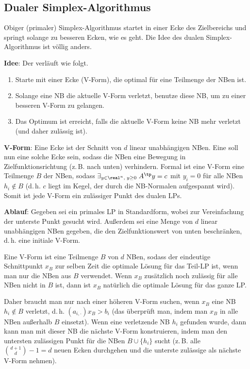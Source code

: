 \pagebreak

\subsection{%
    Dualer Simplex-Algorithmus%
}

Obiger (primaler) Simplex-Algorithmus startet in einer Ecke des Zielbereichs und springt solange
zu besseren Ecken, wie es geht.
Die Idee des dualen Simplex-Algorithmus ist völlig anders.

\textbf{Idee}:
Der  verläuft wie folgt.
\begin{enumerate}
    \item
    Starte mit einer Ecke (V-Form), die optimal für eine Teilmenge der NBen ist.
    
    \item
    Solange eine NB die aktuelle V-Form verletzt, benutze diese NB, um zu einer besseren V-Form
    zu gelangen.
    
    \item
    Das Optimum ist erreicht, falls die aktuelle V-Form keine NB mehr verletzt
    (und daher zulässig ist).
\end{enumerate}

\textbf{V-Form}:
Eine Ecke ist der Schnitt von $d$ linear unabhängigen NBen.
Eine  soll nun eine solche Ecke sein, sodass die NBen eine Bewegung in
Zielfunktionsrichtung (z.\,B. nach unten) verhindern.
Formal ist eine V-Form eine Teilmenge $B$ der NBen,
sodass $\exists_{y \in \real^n,\; y \ge 0}\; A^\tp y = c$
mit $y_i = 0$ für alle NBen $h_i \notin B$
(d.\,h. $c$ liegt im Kegel, der durch die NB-Normalen aufgespannt wird).
Somit ist jede V-Form ein zulässiger Punkt des dualen LPs.

\linie

\textbf{Ablauf}:
Gegeben sei ein primales LP in Standardform, wobei zur Vereinfachung der unterste Punkt gesucht
wird.
Außerdem sei eine Menge von $d$ linear unabhängigen NBen gegeben, die den Zielfunktionswert von
unten beschränken, d.\,h. eine initiale V-Form.

Eine V-Form ist eine Teilmenge $B$ von $d$ NBen, sodass der eindeutige Schnittpunkt $x_B$ zur 
selben Zeit die optimale Lösung für das Teil-LP ist, wenn man nur die NBen aus $B$ verwendet.
Wenn $x_B$ zusätzlich noch zulässig für alle NBen nicht in $B$ ist, dann ist $x_B$ natürlich die
optimale Lösung für das ganze LP.

Daher braucht man nur nach einer höheren V-Form suchen, wenn $x_B$ eine NB $h_i \notin B$
verletzt, d.\,h. $(a_{i,\cdot}) x_B > b_i$
(das überprüft man, indem man $x_B$ in alle NBen außerhalb $B$ einsetzt).
Wenn eine verletzende NB $h_i$ gefunden wurde, dann kann man mit dieser NB die nächste V-Form
konstruieren, indem man den untersten zulässigen Punkt für die NBen $B \cup \{h_i\}$ sucht
(z.\,B. alle $\binom{d+1}{d} - 1 = d$ neuen Ecken durchgehen und
die unterste zulässige als nächste V-Form nehmen).

